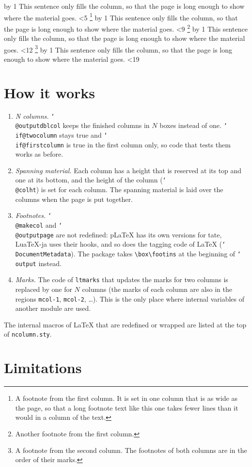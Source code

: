 \documentclass{article}
\makeatletter
\newcommand*\cs[1]{\texttt{\char`\\#1}}
\newcommand\filler[1]{%
  \count@=0
  \loop\advance\count@ by 1
    This sentence only fills the column, so that the page is long
    enough to show where the material goes.
  \ifnum\count@<#1 \repeat}
\makeatother
\begin{document}
\filler{5}\footnote{A footnote from the first column.  It is set in
  one column that is as wide as the page, so that a long footnote text
  like this one takes fewer lines than it would in a column of the
  text.}
\filler{9}\footnote{Another footnote from the first column.}
\filler{12}\footnote{A footnote from the second column.  The
  footnotes of both columns are in the order of their marks.}
\filler{19}

\onecolumn
{}
\setlength\columnseprule{0pt}

\section{How it works}

\begin{enumerate}
\item \emph{N columns.}  \cs{@outputdblcol} keeps the finished columns
  in $N$ boxes instead of one.  \cs{if@twocolumn} stays true and
  \cs{if@firstcolumn} is true in the first column only, so code that
  tests them works as before.
\item \emph{Spanning material.}  Each column has a height that is
  reserved at its top and one at its bottom, and the height of the
  column (\cs{@colht}) is set for each column.  The spanning material
  is laid over the columns when the page is put together.
\item \emph{Footnotes.}  \cs{@makecol} and \cs{@outputpage} are not
  redefined: p\LaTeX{} has its own versions for tate, Lua\TeX-ja uses
  their hooks, and so does the tagging code of \LaTeX{}
  (\cs{DocumentMetadata}).  The package takes \verb|\box\footins| at
  the beginning of \cs{output} instead.
\item \emph{Marks.}  The code of \texttt{ltmarks} that updates the
  marks for two columns is replaced by one for $N$ columns (the marks
  of each column are also in the regions \texttt{mcol-1},
  \texttt{mcol-2}, \ldots).  This is the only place where internal
  variables of another module are used.
\end{enumerate}
The internal macros of \LaTeX{} that are redefined or wrapped are
listed at the top of \texttt{ncolumn.sty}.

\section{Limitations}\label{sec:limitations}
\end{document}
